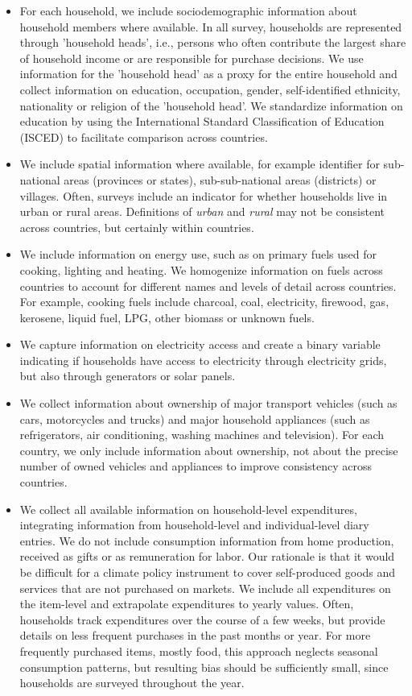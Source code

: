 \documentclass[12pt, a4paper]{article}
\begin{document}
\begin{itemize}
    \item For each household, we include sociodemographic information about household members where available. In all survey, households are represented through 'household heads', i.e., persons who often contribute the largest share of household income or are responsible for purchase decisions. We use information for the 'household head' as a proxy for the entire household and collect information on education, occupation, gender, self-identified ethnicity, nationality or religion of the 'household head'. We standardize information on education by using the International Standard Classification of Education (ISCED) to facilitate comparison across countries.
    \item We include spatial information where available, for example identifier for sub-national areas (provinces or states), sub-sub-national areas (districts) or villages. Often, surveys include an indicator for whether households live in urban or rural areas. Definitions of \textit{urban} and \textit{rural} may not be consistent across countries, but certainly within countries.
    \item We include information on energy use, such as on primary fuels used for cooking, lighting and heating. We homogenize information on fuels across countries to account for different names and levels of detail across countries. For example, cooking fuels include charcoal, coal, electricity, firewood, gas, kerosene, liquid fuel, LPG, other biomass or unknown fuels.
    \item We capture information on electricity access and create a binary variable indicating if households have access to electricity through electricity grids, but also through generators or solar panels. 
    \item We collect information about ownership of major transport vehicles (such as cars, motorcycles and trucks) and major household appliances (such as refrigerators, air conditioning, washing machines and television). For each country, we only include information about ownership, not about the precise number of owned vehicles and appliances to improve consistency across countries.
    \item We collect all available information on household-level expenditures, integrating information from household-level and individual-level diary entries. We do not include consumption information from home production, received as gifts or as remuneration for labor. Our rationale is that it would be difficult for a climate policy instrument to cover self-produced goods and services that are not purchased on markets. We include all expenditures on the item-level and extrapolate expenditures to yearly values. Often, households track expenditures over the course of a few weeks, but provide details on less frequent purchases in the past months or year. For more frequently purchased items, mostly food, this approach neglects seasonal consumption patterns, but resulting bias should be sufficiently small, since households are surveyed throughout the year.

\end{itemize}
\end{document}
